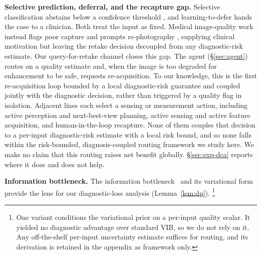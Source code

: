 \textbf{Selective prediction, deferral, and the recapture gap.}
Selective classification abstains below a confidence threshold
\citep{geifman2017selective,geifman2019selectivenet}, and learning-to-defer
hands the case to a clinician. Both treat the input as fixed. Medical
image-quality work instead flags poor capture and prompts re-photography
\citep{vodrahalli2021teledermatology,jalaboi2023explainable,zhao2020lungus},
supplying clinical motivation but leaving the retake decision decoupled from any
diagnostic-risk estimate. Our query-for-retake channel closes this gap. The agent
(\S\ref{sec:agent}) routes on a quality estimate and, when the image is too
degraded for enhancement to be safe, requests re-acquisition. To our knowledge,
this is the first re-acquisition loop bounded by a local diagnostic-risk guarantee
and coupled jointly with the diagnostic decision, rather than triggered by a quality
flag in isolation. Adjacent lines each select a sensing or measurement action, including
active perception and next-best-view planning, active sensing and active feature
acquisition, and human-in-the-loop recapture. None of them couples that decision to a
per-input diagnostic-risk estimate with a local risk bound, and so none falls within the
risk-bounded, diagnosis-coupled routing framework we study here. We make no claim that this
routing raises net benefit globally. \S\ref{sec:exp-dca} reports where it does and does not help.

\textbf{Information bottleneck.}
The information bottleneck~\citep{tishby2000information} and its variational
form~\citep[VIB;][]{alemi2017deep} provide the lens for our diagnostic-loss
analysis (Lemma~\ref{lem:dp}).%
\footnote{One variant conditions the variational prior on a per-input quality
scalar. It yielded no diagnostic advantage over standard VIB, so we do not rely
on it. Any off-the-shelf per-input uncertainty estimate suffices for routing,
and its derivation is retained in the appendix as framework only.}

